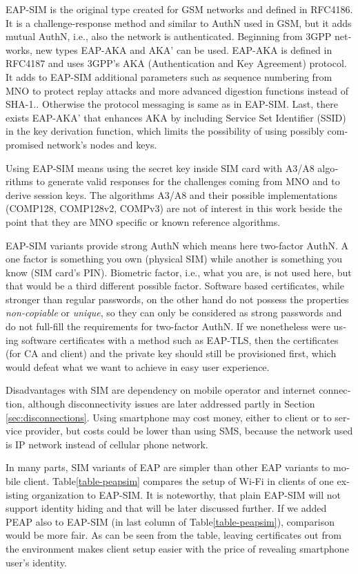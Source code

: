 \documentclass[12pt,a4paper,english]{tutthesis}
\begin{document}
\begin{otherlanguage}{english}
EAP-SIM is the original type created for GSM networks and defined 
in RFC4186\cite{rfc4186}.
It is a challenge-response method and similar to AuthN used in GSM, 
but it adds mutual AuthN, i.e., also the network is authenticated.
Beginning from 3GPP networks, new types EAP-AKA and AKA' can be used.
EAP-AKA is defined in RFC4187\cite{rfc4187} and 
uses 3GPP's AKA (Authentication and Key Agreement) protocol.
It adds to EAP-SIM additional parameters such as
sequence numbering from MNO to protect replay attacks and more
advanced digestion functions instead of SHA-1.\cite{rfc5448}.
Otherwise the protocol messaging is same as in  EAP-SIM.
Last, there exists EAP-AKA' that enhances AKA by including Service Set
Identifier (SSID) 
in the key derivation function, which limits the possibility of using possibly
compromised network's nodes and keys. 


  Using EAP-SIM means using the secret key inside SIM card with A3/A8
algorithms to generate valid responses for the challenges coming from 
MNO and to derive session keys.  The algorithms A3/A8 and their
possible implementations (COMP128, COMP128v2, COMPv3) are not of
interest in this work beside the point that they are MNO specific or known reference algorithms.


EAP-SIM variants provide strong AuthN which means here two-factor
AuthN. A one factor  is something you own (physical SIM) while  
another
is  something you know (SIM card's PIN). Biometric factor, i.e., what you are,
is not used here, but that would be a third different possible factor.
Software based certificates, while stronger than regular passwords,
on the other hand do not possess the properties \emph{non-copiable} or
\emph{unique}, so they can only be considered as strong passwords and 
do not full-fill the requirements for two-factor AuthN.  If we nonetheless
were using software certificates with a method such as EAP-TLS, then the
certificates (for CA and client) and the private key should still be
provisioned first, which would defeat what we want to achieve in
easy user experience.


Disadvantages with SIM are dependency on mobile operator and internet
connection, although disconnectivity issues are later addressed
partly in Section \ref{sec:disconnections}.
Using smartphone may cost money, either to client or to service
provider, but costs could be lower than using SMS, because 
the network  used is IP network instead of cellular phone network.

In many parts, SIM variants of EAP are simpler than other EAP
variants to mobile client.  Table\ref{table-peapsim} compares the setup of Wi-Fi
in clients of one existing organization to EAP-SIM. It
is noteworthy, that plain EAP-SIM will not support identity hiding and
that will be later discussed further. If we added PEAP
also to EAP-SIM (in last column of Table\ref{table-peapsim}), comparison would be more fair.
As can be seen from the table, leaving certificates out from the environment
makes client setup easier with the price of revealing smartphone user's
identity.  




\end{otherlanguage}
\end{document}
